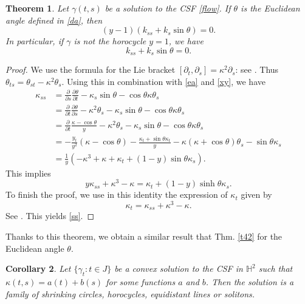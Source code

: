 \documentclass[12pt]{amsart}
\theoremstyle{plain}
\newtheorem{theorem}{Theorem}[section]
\newtheorem{corollary}[theorem]{Corollary}
\theoremstyle{definition}
\def\h{\mathbb H}
\begin{document}
\begin{theorem} \label{t46}
Let $\gamma(t,s)$ be  a       solution to the CSF \eqref{flow}. If $\theta$ is the Euclidean angle defined in \eqref{da}, then 
\begin{equation}\label{ss}
(y-1)\left(k_{ss}+k_s \sin\theta\right)=0. 
\end{equation}
In particular, if $\gamma$ is not the horocycle $y=1$, we have 
$$k_{ss}+k_s \sin\theta=0. $$
\end{theorem}
\begin{proof}
We use the formula for the Lie bracket  $[\partial_t, \partial_s] = \kappa^2 \partial_s$: see \cite{gr}. Thus $\theta_{ts}=\theta_{st}-\kappa^2\theta_s$. Using this in combination with   \eqref{ea} and \eqref{xy}, we have
\begin{equation*}
\begin{split}
\kappa_{ss}&=\frac{\partial}{\partial s}\frac{\partial\theta}{\partial t}-\kappa_s\sin\theta-\cos\theta\kappa\theta_s\\
&=\frac{\partial}{\partial t}\frac{\partial\theta}{\partial s}-\kappa^2\theta_s-\kappa_s\sin\theta-\cos\theta\kappa\theta_s\\
&=\frac{\partial}{\partial t} \frac{ \kappa-\cos\theta}{y}-\kappa^2\theta_s-\kappa_s\sin\theta-\cos\theta\kappa\theta_s\\
&=-\frac{y_t}{y^2}(\kappa-\cos\theta)-\frac{\kappa_t+\sin\theta\kappa_t}{y}-\kappa(\kappa+\cos\theta)\theta_s-\sin\theta\kappa_s\\
&=\frac{1}{y}\left(-\kappa^3+\kappa+\kappa_t+(1-y)\sin\theta\kappa_s\right).
\end{split}
\end{equation*}
This implies 
$$y\kappa_{ss}+\kappa^3-\kappa=\kappa_t+(1-y)\sinh\theta\kappa_s.$$
To finish the proof, we use in this identity the expression of $\kappa_{t}$ given by 
\begin{equation}\label{dgr}
\kappa_t=\kappa_{ss}+\kappa^3-\kappa.
\end{equation}
See \cite[Lem. 1.3]{gr}. This yields \eqref{ss}.
\end{proof}

Thanks to this theorem, we obtain a similar result that Thm. \ref{t42} for the Euclidean angle   $\theta$.

\begin{corollary}\label{c47} 
Let $\{\gamma_t\colon t \in J\}$ be a convex solution to the CSF in $\h^2$ such that $\kappa(t,s)=a(t)+b(s)$ for some functions $a$ and $b$.  Then the solution   is a  family of shrinking circles, horocycles, equidistant lines or solitons.
 \end{corollary}
\end{document}
